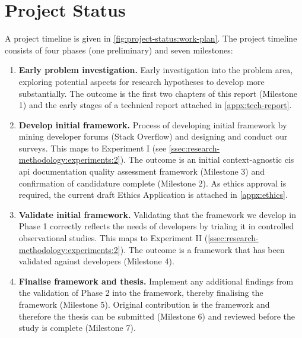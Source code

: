 \chapter{Project Status}
\label{ch:project-status}

\graphicspath{{mainmatter/project-status/figures/}}

A project timeline is given in \cref{fig:project-status:work-plan}. The project timeline consists of four phases (one preliminary) and seven milestones:

\bigskip
\begin{enumerate}[label=\textbf{Phase \arabic*.},start=0,leftmargin=2.5cm]
  \item \textbf{Early problem investigation.} Early investigation into the problem area, exploring potential aspects for research hypotheses to develop more substantially. The outcome is the first two chapters of this report (Milestone 1) and the early stages of a technical report attached in \cref{appx:tech-report}.
  \item \textbf{Develop initial framework.} Process of developing initial framework by mining developer forums (Stack Overflow) and designing and conduct our surveys. This maps to Experiment I (see \cref{ssec:research-methodology:experiments:2}). The outcome is an initial context-agnostic \gls{cis} \gls{api} documentation quality assessment framework (Milestone 3) and confirmation of candidature complete (Milestone 2). As ethics approval is required, the current draft Ethics Application is attached in \cref{appx:ethics}.
  \item \textbf{Validate initial framework.} Validating that the framework we develop in Phase 1 correctly reflects the needs of developers by trialing it in controlled observational studies. This maps to Experiment II (\cref{ssec:research-methodology:experiments:2}). The outcome is a framework that has been validated against developers (Milestone 4).
  \item \textbf{Finalise framework and thesis.} Implement any additional findings from the validation of Phase 2 into the framework, thereby finalising the framework (Milestone 5). Original contribution is the framework and therefore the thesis can be submitted (Milestone 6) and reviewed before the study is complete (Milestone 7).
\end{enumerate}

